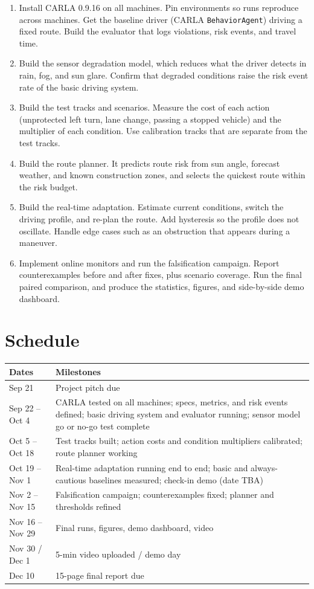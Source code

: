 \documentclass[10pt]{article}
\begin{document}
\begin{enumerate}
  \item Install CARLA 0.9.16 on all machines. Pin environments so runs reproduce across machines. Get the baseline driver (CARLA \texttt{BehaviorAgent}) driving a fixed route. Build the evaluator that logs violations, risk events, and travel time.
  \item Build the sensor degradation model, which reduces what the driver detects in rain, fog, and sun glare. Confirm that degraded conditions raise the risk event rate of the basic driving system.
  \item Build the test tracks and scenarios. Measure the cost of each action (unprotected left turn, lane change, passing a stopped vehicle) and the multiplier of each condition. Use calibration tracks that are separate from the test tracks.
  \item Build the route planner. It predicts route risk from sun angle, forecast weather, and known construction zones, and selects the quickest route within the risk budget.
  \item Build the real-time adaptation. Estimate current conditions, switch the driving profile, and re-plan the route. Add hysteresis so the profile does not oscillate. Handle edge cases such as an obstruction that appears during a maneuver.
  \item Implement online monitors and run the falsification campaign. Report counterexamples before and after fixes, plus scenario coverage. Run the final paired comparison, and produce the statistics, figures, and side-by-side demo dashboard.
\end{enumerate}

\section{Schedule}

\begin{tabularx}{\textwidth}{@{}l X@{}}
  \toprule
  \textbf{Dates} & \textbf{Milestones} \\
  \midrule
  Sep 21 & Project pitch due \\
  Sep 22 -- Oct 4 & CARLA tested on all machines; specs, metrics, and risk events defined; basic driving system and evaluator running; sensor model go or no-go test complete \\
  Oct 5 -- Oct 18 & Test tracks built; action costs and condition multipliers calibrated; route planner working \\
  Oct 19 -- Nov 1 & Real-time adaptation running end to end; basic and always-cautious baselines measured; check-in demo (date TBA) \\
  Nov 2 -- Nov 15 & Falsification campaign; counterexamples fixed; planner and thresholds refined \\
  Nov 16 -- Nov 29 & Final runs, figures, demo dashboard, video \\
  Nov 30 / Dec 1 & 5-min video uploaded / demo day \\
  Dec 10 & 15-page final report due \\
  \bottomrule
\end{tabularx}
\end{document}
